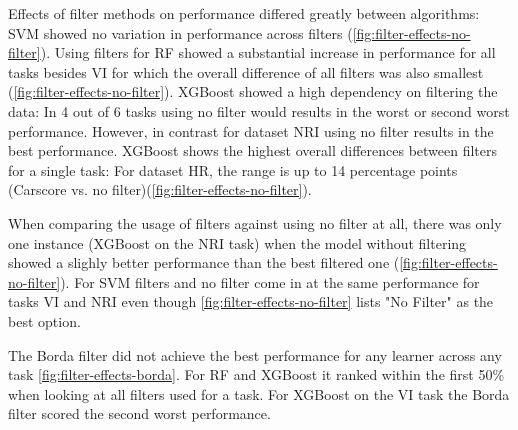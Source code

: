 \documentclass[letterpaper, peerreview]{IEEEtran}
\begin{document}
Effects of filter methods on performance differed greatly between algorithms:
SVM showed no variation in performance across filters (\autoref{fig:filter-effects-no-filter}).
Using filters for RF showed a substantial increase in performance for all tasks besides VI for which the overall difference of all filters was also smallest (\autoref{fig:filter-effects-no-filter}).
XGBoost showed a high dependency on filtering the data: In 4 out of 6 tasks using no filter would results in the worst or second worst performance.
However, in contrast for dataset NRI using no filter results in the best performance.
XGBoost shows the highest overall differences between filters for a single task: For dataset HR, the range is up to 14 percentage points (Carscore vs. no filter)(\autoref{fig:filter-effects-no-filter}).

When comparing the usage of filters against using no filter at all, there was only one instance (XGBoost on the NRI task) when the model without filtering showed a slighly better performance than the best filtered one (\autoref{fig:filter-effects-no-filter}).
For SVM filters and no filter come in at the same performance for tasks VI and NRI even though \autoref{fig:filter-effects-no-filter} lists "No Filter" as the best option.

The Borda filter did not achieve the best performance for any learner across any task \autoref{fig:filter-effects-borda}.
For RF and XGBoost it ranked within the first 50\% when looking at all filters used for a task.
For XGBoost on the VI task the Borda filter scored the second worst performance.



%




\end{document}
